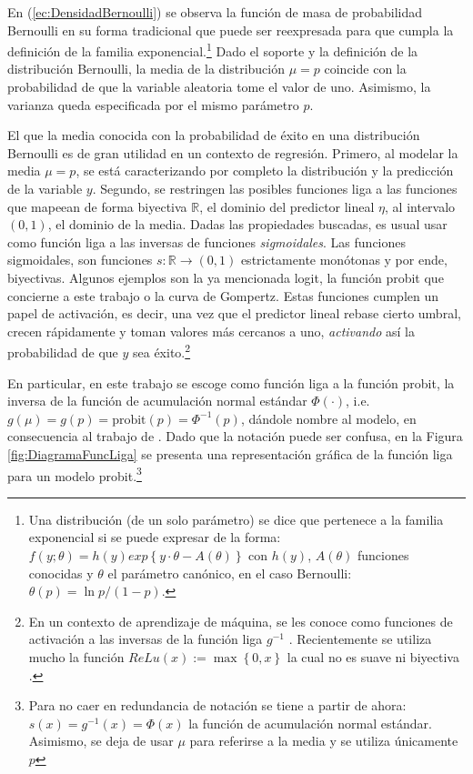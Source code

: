 \documentclass[../Main/Main.tex]{subfiles}
\begin{document}
En (\ref{ec:DensidadBernoulli}) se observa la función de masa de probabilidad Bernoulli en su forma tradicional que puede ser reexpresada para que cumpla la definición de la familia exponencial.\footnote{Una distribución (de un solo parámetro) se dice que pertenece a la familia exponencial si se puede expresar de la forma: $f(y;\theta) = h(y)exp\left\{y\cdot\theta - A(\theta)\right\}$ con $h(y)$, $A(\theta)$ funciones conocidas y $\theta$ el parámetro canónico, en el caso Bernoulli: $\theta(p) = \ln p/(1-p)$.} Dado el soporte y la definición de la distribución Bernoulli, la media de la distribución $\mu = p$ coincide con la probabilidad de que la variable aleatoria tome el valor de uno. Asimismo, la varianza queda especificada por el mismo parámetro $p$. 

El que la media conocida con la probabilidad de éxito en una distribución Bernoulli es de gran utilidad en un contexto de regresión. Primero, al modelar la media $\mu = p$, se está caracterizando por completo la distribución y la predicción de la variable $y$. Segundo, se restringen las posibles funciones liga a las funciones que mapeean de forma biyectiva $\mathbb{R}$, el dominio del predictor lineal $\eta$, al intervalo $(0,1)$, el dominio de la media. Dadas las propiedades buscadas, es usual usar como función liga a las inversas de funciones \textit{sigmoidales}. Las funciones sigmoidales, son funciones $s:\mathbb{R}\rightarrow (0,1)$ estrictamente monótonas y por ende, biyectivas. Algunos ejemplos son la ya mencionada logit, la función probit que concierne a este trabajo o la curva de Gompertz. Estas funciones cumplen un papel de activación, es decir, una vez que el predictor lineal rebase cierto umbral, crecen rápidamente y toman valores más cercanos a uno, \textit{activando} así la probabilidad de que $y$ sea éxito.\footnote{En un contexto de aprendizaje de máquina, se les conoce como funciones de activación a las inversas de la función liga $g^{-1}$ \autocite{bishop2006pattern}. Recientemente se utiliza mucho la función $\textit{ReLu}(x):= \max\left\{0,x\right\}$ la cual no es suave ni biyectiva \autocite{3blue1brown2017}.}

En particular, en este trabajo se escoge como función liga a la función probit, la inversa de la función de acumulación normal estándar $\Phi(\cdot)$, i.e. $g(\mu) = g(p) = \text{probit}(p) = \Phi^{-1}(p)$, dándole nombre al modelo, en consecuencia al trabajo de \citet{albert1993bayesian}. Dado que la notación puede ser confusa, en la Figura \ref{fig:DiagramaFuncLiga} se presenta una representación gráfica de la función liga para un modelo probit.\footnote{Para no caer en redundancia de notación se tiene a partir de ahora: $s(x) = g^{-1}(x) = \Phi(x)$ la función de acumulación normal estándar. Asimismo, se deja de usar $\mu$ para referirse a la media y se utiliza únicamente $p$}
\end{document}
